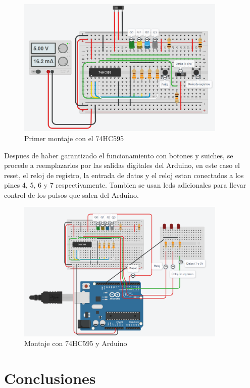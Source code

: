 \documentclass{article}
\begin{document}
\begin{figure}[!ht]
\includegraphics[width=10cm]{montaje0.PNG}
\centering
\caption{Primer montaje con el 74HC595}
\end{figure}

Despues de haber garantizado el funcionamiento con botones y suiches, se procede a reemplazarlos por las salidas digitales del Arduino, en este caso el reset, el reloj de registro, la entrada de datos y el reloj estan conectados a los pines 4, 5, 6 y 7 respectivamente. Tambien se usan leds adicionales para llevar control de los pulsos que salen del Arduino.

\begin{figure}[!ht]
\includegraphics[width=10cm]{montaje1.PNG}
\centering
\caption{Montaje con 74HC595 y Arduino}
\end{figure}



\section{Conclusiones} \label{conclusiones}




\end{document}
